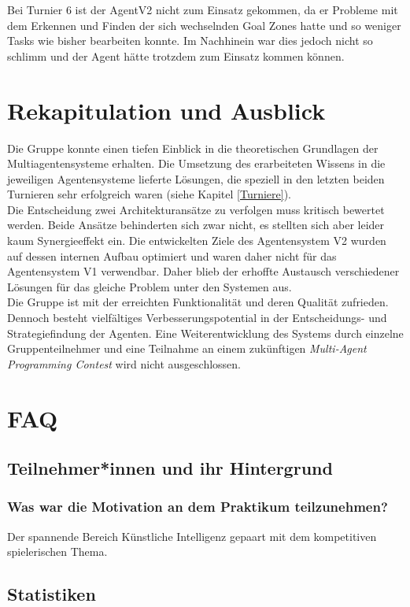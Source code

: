 \documentclass[runningheads]{llncs}
\begin{document}
Bei Turnier 6 ist der AgentV2 nicht zum Einsatz gekommen, da er Probleme mit dem Erkennen und Finden der sich wechselnden Goal Zones hatte und so weniger Tasks wie bisher bearbeiten konnte. Im Nachhinein war dies jedoch nicht so schlimm und der Agent hätte trotzdem zum Einsatz kommen können. 

\section{Rekapitulation und Ausblick}
Die Gruppe konnte einen tiefen Einblick in die theoretischen Grundlagen der Multiagentensysteme erhalten. Die Umsetzung des erarbeiteten Wissens in die jeweiligen Agentensysteme lieferte Lösungen, die speziell in den letzten beiden Turnieren sehr erfolgreich waren (siehe Kapitel \ref{Turniere}). \\
Die Entscheidung zwei Architekturansätze zu verfolgen muss kritisch bewertet werden. Beide Ansätze behinderten sich zwar nicht, es stellten sich aber leider kaum Synergieeffekt ein. Die entwickelten Ziele des Agentensystem V2 wurden auf dessen internen Aufbau optimiert und waren daher nicht für das Agentensystem V1 verwendbar. Daher blieb der erhoffte Austausch verschiedener Lösungen für das gleiche Problem unter den Systemen aus. \\
Die Gruppe ist mit der erreichten Funktionalität und deren Qualität zufrieden. Dennoch besteht vielfältiges Verbesserungspotential in der Entscheidungs- und Strategiefindung der Agenten.
Eine Weiterentwicklung des Systems durch einzelne Gruppenteilnehmer und eine Teilnahme an einem zukünftigen \textit{Multi-Agent Programming Contest} wird nicht ausgeschlossen.

\section{FAQ}
\subsection{Teilnehmer*innen und ihr Hintergrund}
\subsubsection{Was war die Motivation an dem Praktikum teilzunehmen?\\}
Der spannende Bereich Künstliche Intelligenz gepaart mit dem kompetitiven spielerischen Thema.

\subsection{Statistiken}
\end{document}
